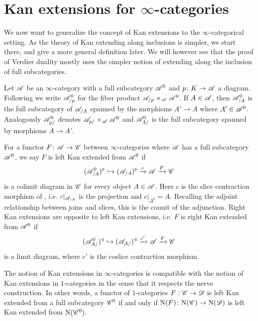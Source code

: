 \documentclass[../../thesis.tex]{subfiles}
\begin{document}
\section{Kan extensions for $\infty$-categories}
We now want to generalize the concept of Kan extensions to the $\infty$-categorical setting.
As the theory of Kan extending along inclusions is simpler, we start there, and give a more general definition later.
We will however see that the proof of Verdier duality mostly uses the simpler notion of extending along the inclusion of full subcategories.
\begin{definition}
    Let $\mathscr{A}$ be an $\infty$-category with a full subcategory $\mathscr{A}^0$ and $p\colon K\to \mathscr{A}$ a diagram.
    Following \cite[Notation 4.3.2.1]{HTT} we write $\mathscr{A}^0_{/p}$ for the fiber product $\mathscr{A}_{/p}\times_{\mathscr{A}}\mathscr{A}^0$.
    If $A\in \mathscr{A}$, then $\mathscr{A}^0_{/A}$ is the full subcategory of $\mathscr{A}_{/A}$ spanned by the morphisms $A'\to A$ where $A'\in \mathscr{A}^0$.
    \newline
    Analogously $\mathscr{A}^0_{p/}$ denotes $\mathscr{A}_{p/}\times_{\mathscr{A}}\mathscr{A}^0$ and $\mathscr{A}^0_{A/}$ is the full subcategory spanned by morphisms $A\to A'$.
\end{definition}
\begin{definition}\label{KanDef}
    For a functor $F\colon \mathscr{A} \to \mathscr{C}$ between $\infty$-categories where $\mathscr{A}$ has a full subcategory $\mathscr{A}^0$, we say $F$ is left Kan extended from $\mathscr{A}^{0}$ if
    \[
        (\mathscr{A}^{0}_{/A})^{\triangleright} \hookrightarrow (\mathscr{A}_{/A})^{\triangleright} \xrightarrow{c} \mathscr{A} \xrightarrow{F}\mathscr{C}
    \]
    is a colimit diagram in $\mathscr{C}$ for every object $A\in \mathscr{A}$.
    Here $c$ is the slice contraction morphism of \cite[\href{https://kerodon.net/tag/0188}{Tag 0188}]{kerodon}, i.e.
    $c|_{\mathscr{A}_{/A}}$ is the projection and $c|_{\Delta^0}=A$.
    Recalling the adjoint relationship between joins and slices, this is the counit of the adjunction.
    \newline
    Right Kan extensions are opposite to left Kan extensions, i.e. $F$ is right Kan extended from $\mathscr{A}^0$ if
    \[
        (\mathscr{A}^{0}_{A/})^{\triangleleft} \hookrightarrow (\mathscr{A}_{A/})^{\triangleleft} \xrightarrow{c'} \mathscr{A} \xrightarrow{F}\mathscr{C}
    \]
    is a limit diagram, where $c'$ is the coslice contraction morphism.
\end{definition}
\begin{example}
    The notion of Kan extensions in $\infty$-categories is compatible with the notion of Kan extensions in $1$-categories in the sense that it respects the nerve construction.
    In other words, a functor of $1$-categories $F : \mathscr{C} \to \mathscr{D}$ is left Kan extended from a full subcategory $\mathscr{C}^{0}$ if and only if $\mathrm{N}(F) \colon \mathrm{N}(\mathscr{C}) \to \mathrm{N}(\mathscr{D})$ is left Kan extended from $\mathrm{N}(\mathscr{C}^{0})$.
\end{example}
\end{document}
